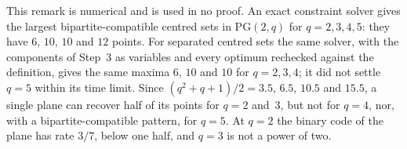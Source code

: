 \begin{remark}[Numerical]\label{rem:PG-numerical}
This remark is numerical and is used in no proof. An exact constraint solver gives the largest bipartite-compatible
centred sets in $\mathrm{PG}(2,q)$ for $q=2,3,4,5$: they have $6$, $10$, $10$ and $12$ points. For separated centred sets
the same solver, with the components of Step~3 as variables and every optimum rechecked against the definition, gives the
same maxima $6$, $10$ and $10$ for $q=2,3,4$; it did not settle $q=5$ within its time limit. Since
$(q^2+q+1)/2=3.5$, $6.5$, $10.5$ and $15.5$, a single plane can recover half of its points for $q=2$ and~$3$, but not
for $q=4$, nor, with a bipartite-compatible pattern, for $q=5$. At $q=2$ the binary code of the plane has rate $3/7$,
below one half, and $q=3$ is not a power of two.
\end{remark}
